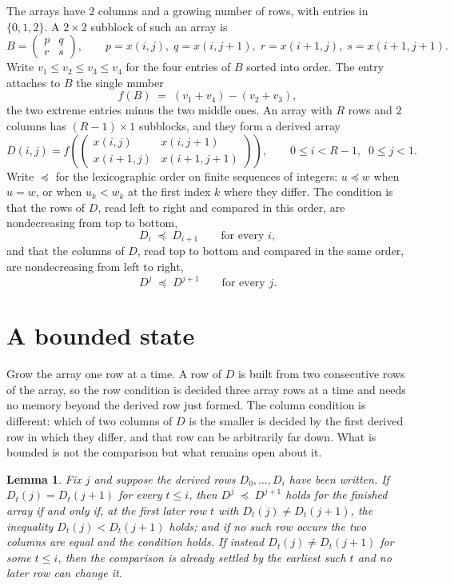 \documentclass[11pt,a4paper]{article}
\theoremstyle{plain}
\newtheorem{lemma}[theorem]{Lemma}
\theoremstyle{definition}
\begin{document}
The arrays have $2$ columns and a growing number of rows, with entries in $\{0,1,2\}$. A
$2\times2$ subblock of such an array is
\[
B=\begin{pmatrix} p & q \\ r & s \end{pmatrix},
\qquad p=x(i,j),\; q=x(i,j+1),\; r=x(i+1,j),\; s=x(i+1,j+1).
\]
Write $v_1\le v_2\le v_3\le v_4$ for the four entries of $B$ sorted into order. The entry attaches to $B$ the single number
\[
f(B)\;=\;(v_1+v_4)-(v_2+v_3),
\]
the two extreme entries minus the two middle ones. An array with $R$ rows and $2$ columns has $(R-1)\times1$ subblocks, and they
form a derived array
\[
D(i,j)=f\!\left(\begin{pmatrix} x(i,j) & x(i,j+1) \\ x(i+1,j) & x(i+1,j+1)\end{pmatrix}
\right),\qquad 0\le i<R-1,\;\; 0\le j<1 .
\]
Write $\preceq$ for the lexicographic order on finite sequences of integers: $u\preceq w$ when
$u=w$, or when $u_k<w_k$ at the first index $k$ where they differ. The condition is that the
rows of $D$, read left to right and compared in this order, are nondecreasing from top to bottom,
\[
D_{i}\;\preceq\;D_{i+1}\qquad\text{for every } i,
\]
and that the columns of $D$, read top to bottom and compared in the same order, are nondecreasing
from left to right,
\[
D^{j}\;\preceq\;D^{j+1}\qquad\text{for every } j .
\]

\section{A bounded state}

Grow the array one row at a time. A row of $D$ is built from two consecutive rows of the array,
so the row condition is decided three array rows at a time and needs no memory beyond the
derived row just formed. The column condition is different: which of two columns of $D$ is the
smaller is decided by the first derived row in which they differ, and that row can be
arbitrarily far down. What is bounded is not the comparison but what remains open about it.

\begin{lemma}\label{lem:bits}
Fix $j$ and suppose the derived rows $D_0,\dots,D_i$ have been written. If $D_t(j)=D_t(j+1)$ for
every $t\le i$, then $D^{j}\;\preceq\;D^{j+1}$ holds for the finished array if and only if,
at the first later row $t$ with $D_t(j)\neq D_t(j+1)$, the inequality $D_t(j)<D_t(j+1)$
holds; and if no such row occurs the two columns are equal and the condition holds. If instead
$D_t(j)\neq D_t(j+1)$ for some $t\le i$, then the comparison is already settled by the earliest
such $t$ and no later row can change it.
\end{lemma}
\end{document}
